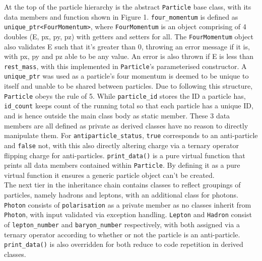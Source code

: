 \documentclass[12pt]{report}
\begin{document}
At the top of the particle hierarchy is the abstract \texttt{Particle} base class, with its data members and function shown in Figure 1. \texttt{four\_momentum} is defined as \texttt{unique\_ptr<FourMomentum>}, where \texttt{FourMomentum} is an object comprising of 4 doubles (E, px, py, pz) with getters and setters for all. The \texttt{FourMomentum} object also validates E such that it's greater than 0, throwing an error message if it is, with px, py and pz able to be any value. An error is also thrown if E is less than \texttt{rest\_mass}, with this implemented in \texttt{Particle}'s parameterised constructor. A \texttt{unique\_ptr} was used as a particle's four momentum is deemed to be unique to itself and unable to be shared between particles. Due to following this structure, \texttt{Particle} obeys the rule of 5. While \texttt{particle\_id} stores the ID a particle has, \texttt{id\_count} keeps count of the running total so that each particle has a unique ID, and is hence outside the main class body as static member. These 3 data members are all defined as private as derived classes have no reason to directly manipulate them. For \texttt{antiparticle\_status}, \texttt{true} corresponds to an anti-particle and \texttt{false} not, with this also directly altering charge via a ternary operator flipping charge for anti-particles. \texttt{print\_data()} is a pure virtual function that prints all data members contained within \texttt{Particle}. By defining it as a pure virtual function it ensures a generic particle object can't be created.\\

The next tier in the inheritance chain contains classes to reflect groupings of particles, namely hadrons and leptons, with an additional class for photons. \texttt{Photon} consists of \texttt{polarisation} as a private member as no classes inherit from \texttt{Photon}, with input validated via exception handling. \texttt{Lepton} and \texttt{Hadron} consist of \texttt{lepton\_number} and \texttt{baryon\_number} respectively, with both assigned via a ternary operator according to whether or not the particle is an anti-particle. \texttt{print\_data()} is also overridden for both reduce to code repetition in derived classes.\\
\end{document}
